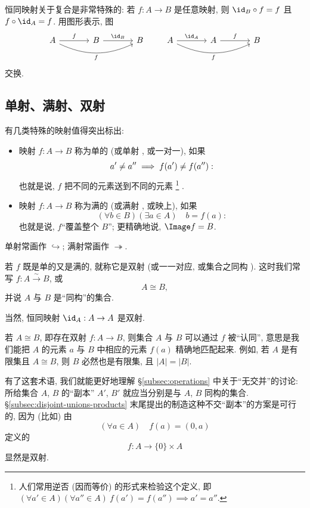 恒同映射关于复合是非常特殊的: 若 $f : A \to B$ 是任意映射, 则 $\id_B \circ f = f$ 且 $f \circ \id_A = f$. 用图形表示, 图
\[
\begin{tikzcd}[column sep=large]
A \ar[r,"f"] \ar[rr,bend right=25,"f"'] & B \ar[r,"\id_B"] & B
\end{tikzcd}
\qquad
\begin{tikzcd}[column sep=large]
A \ar[r,"\id_A"] \ar[rr,bend right=25,"f"'] & A \ar[r,"f"] & B
\end{tikzcd}
\]
交换.

\subsection{单射、满射、双射}
\label{subsec:inj-surj-bij}

有几类特殊的映射值得突出标出:
\begin{itemize}
	\item 映射 $f : A \to B$ 称为单的%
(或单射%
, 或一对一), 如果
	\[
\index{Lie@Lie!Sophus@Sophus!kuohao@括号(bracket)}	a' \neq a'' \implies f(a') \neq f(a''):
	\]
	也就是说, $f$ 把不同的元素送到不同的元素%
	\footnote{人们常用逆否 (因而等价) 的形式来检验这个定义, 即 $(\forall a' \in A)(\forall a'' \in A)\ f(a') = f(a'') \implies a' = a''$.}%
	.

	\item 映射 $f : A \to B$ 称为满的%
(或满射%
, 或映上), 如果
	\[
	(\forall b \in B) (\exists a \in A) \quad b = f(a):
	\]
	也就是说, $f$``覆盖整个 $B$''; 更精确地说, $\Image f = B$.
\end{itemize}
单射常画作 $\hookrightarrow$; 满射常画作 $\twoheadrightarrow$.

若 $f$ 既是单的又是满的, 就称它是双射%
(或一一对应, 或集合之同构%
). 这时我们常写 $f : A \xrightarrow{\sim} B$, 或
\[
A \cong B,
\]
并说 $A$ 与 $B$ 是``同构''的集合.

当然, 恒同映射 $\id_A : A \to A$ 是双射.

若 $A \cong B$, 即存在双射 $f : A \to B$, 则集合 $A$ 与 $B$ 可以通过 $f$ 被``认同'', 意思是我们能把 $A$ 的元素 $a$ 与 $B$ 中相应的元素 $f(a)$ 精确地匹配起来. 例如, 若 $A$ 是有限集且 $A \cong B$, 则 $B$ 必然也是有限集, 且 $|A| = |B|$.

有了这套术语, 我们就能更好地理解 \S\ref{subsec:operations} 中关于``无交并''的讨论: 所给集合 $A$, $B$ 的``副本'' $A'$, $B'$ 就应当分别是与 $A$, $B$ 同构的集合. \S\ref{subsec:disjoint-unions-products} 末尾提出的制造这种不交``副本''的方案是可行的, 因为 (比如) 由
\[
(\forall a \in A) \quad f(a) = (0, a)
\]
定义的
\[
f : A \to \{0\} \times A
\]
显然是双射.

